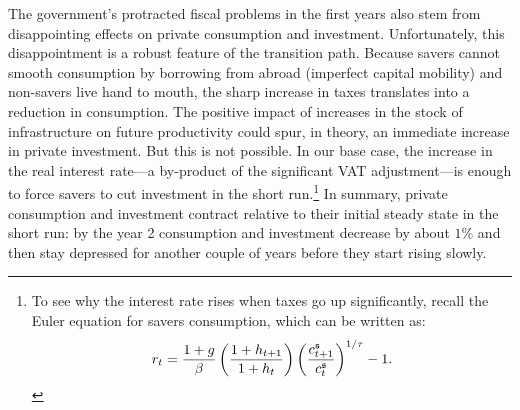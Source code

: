 \documentclass[11pt]{article}
\begin{document}

The government's protracted fiscal problems in the first years also stem
from disappointing effects on private consumption and investment.
Unfortunately, this disappointment is a robust feature of the transition
path. Because savers cannot smooth consumption by borrowing from abroad
(imperfect capital mobility) and non-savers live hand to mouth, the sharp
increase in taxes translates into a reduction in consumption. The positive
impact of increases in the stock of infrastructure on future productivity
could spur, in theory, an immediate increase in private investment. But this
is not possible. In our base case, the increase in the real interest
rate---a by-product of the significant VAT adjustment---is enough to force
savers to cut investment in the short run.\footnote{%
To see why the interest rate rises when taxes go up significantly, recall
the Euler equation for savers consumption, which can be written as:%
\begin{equation*}
r_{t}=\frac{1+g}{\beta }\left( \frac{1+h_{t+1}}{1+h_{t}}\right) \left( \frac{%
c_{t+1}^{\mathfrak{s}}}{c_{t}^{\mathfrak{s}}}\right) ^{1/\tau }-1.
\end{equation*}%
} In summary, private consumption and investment contract relative to their
initial steady state in the short run: by the year 2 consumption and
investment decrease by about $1\%$ and then stay depressed for another
couple of years before they start rising slowly.
\end{document}
